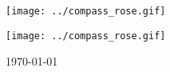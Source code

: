 \documentclass[10pt]{book}
\begin{document}


\label{Rose:postscriptVersionOfTutorial}

\begin{htmlonly}
   \centering \texttt{[image: ../compass\_rose.gif]}
\end{htmlonly}

\maketitle

\begin{htmlonly}
   \centering \texttt{[image: ../compass\_rose.gif]}
\end{htmlonly}

\begin{center}
\today
\end{center}

%

%
%
%

\tableofcontents
\listoffigures
\newpage
%

% 
\end{document}

